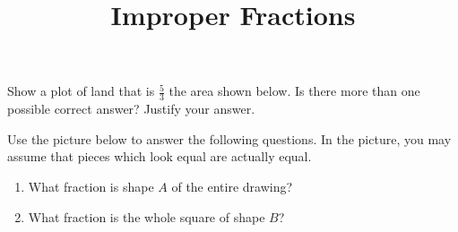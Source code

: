 \documentclass[nooutcomes, noauthor, handout]{ximera}
\title{Improper Fractions}
\begin{document}
\begin{abstract}\end{abstract}
\maketitle



\begin{problem}
 Show a plot of land that is $\frac{5}{3}$ the area shown below.  Is there more than one possible correct answer? Justify your answer.

\begin{image}
\end{image}
\end{problem}

\begin{problem}
 Use the picture below to answer the following questions. In the picture, you may assume that pieces which look equal are actually equal. 
\begin{enumerate}
\item What fraction is shape $A$ of the entire drawing?
\item  What fraction is the whole square of shape $B$?
\end{enumerate}

\begin{image}
\end{image}
\end{problem}
\newpage
\end{document}
